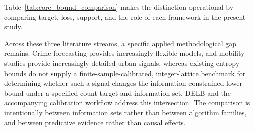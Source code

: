 Table~\ref{tab:core_bound_comparison} makes the distinction operational by
comparing target, loss, support, and the role of each framework in the present
study.



Across these three literature streams, a specific applied methodological gap
remains. Crime forecasting provides increasingly flexible models,
and mobility studies provide increasingly detailed urban signals, whereas
existing entropy bounds do not supply a finite-sample-calibrated,
integer-lattice benchmark for determining whether such a signal changes the
information-constrained lower bound under a specified count target and information
set. DELB and the accompanying calibration
workflow address this intersection. The comparison is intentionally between
information sets rather than between algorithm families, and between
predictive evidence rather than causal effects.
